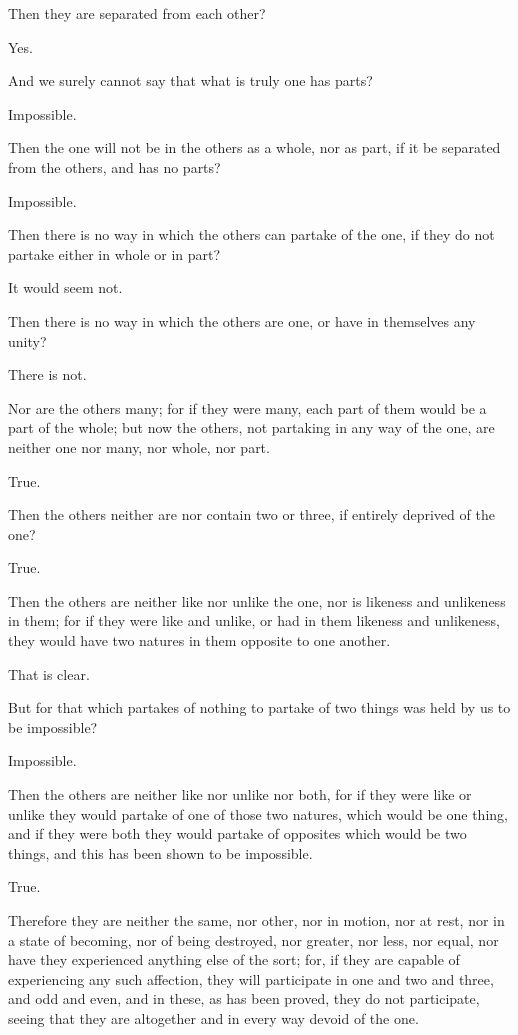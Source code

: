 Then they are separated from each other?

Yes.

And we surely cannot say that what is truly one has parts?

Impossible.

Then the one will not be in the others as a whole, nor as part, if it be
separated from the others, and has no parts?

Impossible.

Then there is no way in which the others can partake of the one, if they
do not partake either in whole or in part?

It would seem not.

Then there is no way in which the others are one, or have in themselves
any unity?

There is not.

Nor are the others many; for if they were many, each part of them would
be a part of the whole; but now the others, not partaking in any way of
the one, are neither one nor many, nor whole, nor part.

True.

Then the others neither are nor contain two or three, if entirely
deprived of the one?

True.

Then the others are neither like nor unlike the one, nor is likeness
and unlikeness in them; for if they were like and unlike, or had in them
likeness and unlikeness, they would have two natures in them opposite to
one another.

That is clear.

But for that which partakes of nothing to partake of two things was held
by us to be impossible?

Impossible.

Then the others are neither like nor unlike nor both, for if they were
like or unlike they would partake of one of those two natures, which
would be one thing, and if they were both they would partake of
opposites which would be two things, and this has been shown to be
impossible.

True.

Therefore they are neither the same, nor other, nor in motion, nor at
rest, nor in a state of becoming, nor of being destroyed, nor greater,
nor less, nor equal, nor have they experienced anything else of the
sort; for, if they are capable of experiencing any such affection, they
will participate in one and two and three, and odd and even, and in
these, as has been proved, they do not participate, seeing that they are
altogether and in every way devoid of the one.

